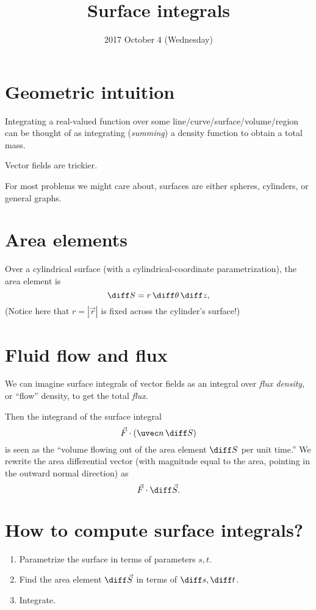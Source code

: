 \documentclass{multi}
\title{Surface integrals}
\date{2017 October 4 (Wednesday)}
\begin{document}
\section*{Geometric intuition}

Integrating a real-valued function over some line/curve/surface/volume/region can be thought of as integrating (\emph{summing}) a density function to obtain a total mass.


Vector fields are trickier. 

For most problems we might care about, surfaces are either spheres, cylinders, or general graphs.


\section*{Area elements}

Over a cylindrical surface (with a cylindrical-coordinate parametrization), the area element is
\[
    \diff S = r \, \diff \theta \, \diff z,
\]
(Notice here that \(r = |\vec r|\) is fixed across the cylinder's surface!)

\section*{Fluid flow and flux}

We can imagine surface integrals of vector fields as an integral over \emph{flux density}, or ``flow'' density, to get the total \emph{flux}. 

Then the integrand of the surface integral
\[
    \vec F \cdot (\uvec n \, \diff S)
\]
is seen as the ``volume flowing out of the area element \(\diff S\) per unit time.'' We rewrite the area differential vector (with magnitude equal to the area, pointing in the outward normal direction) as
\[
    \vec F \cdot \diff \vec S.
\]

\section*{How to compute surface integrals?}

\begin{enumerate}
\item Parametrize the surface in terms of parameters \(s, t\).
\item Find the area element \(\diff \vec S\) in terms of \(\diff s, \diff t\).
\item Integrate.
\end{enumerate}
\end{document}
